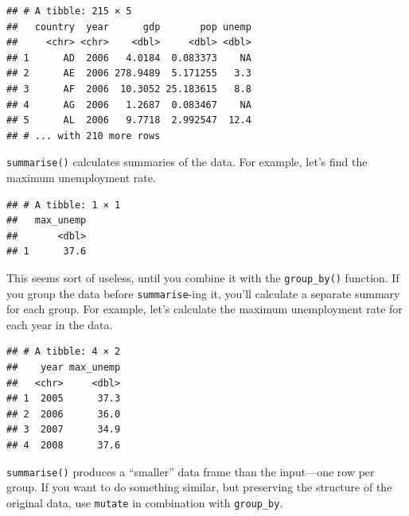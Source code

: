 \documentclass[12pt,oneside,openany]{book}
\newenvironment{Shaded}{\begin{snugshade}}{\end{snugshade}}
\newcommand{\KeywordTok}[1]{\textcolor[rgb]{0.13,0.29,0.53}{\textbf{#1}}}
\newcommand{\DataTypeTok}[1]{\textcolor[rgb]{0.13,0.29,0.53}{#1}}
\newcommand{\StringTok}[1]{\textcolor[rgb]{0.31,0.60,0.02}{#1}}
\newcommand{\OtherTok}[1]{\textcolor[rgb]{0.56,0.35,0.01}{#1}}
\newcommand{\OperatorTok}[1]{\textcolor[rgb]{0.81,0.36,0.00}{\textbf{#1}}}
\newcommand{\NormalTok}[1]{#1}
\begin{document}
\begin{verbatim}
## # A tibble: 215 × 5
##   country  year      gdp       pop unemp
##     <chr> <chr>    <dbl>     <dbl> <dbl>
## 1      AD  2006   4.0184  0.083373    NA
## 2      AE  2006 278.9489  5.171255   3.3
## 3      AF  2006  10.3052 25.183615   8.8
## 4      AG  2006   1.2687  0.083467    NA
## 5      AL  2006   9.7718  2.992547  12.4
## # ... with 210 more rows
\end{verbatim}

\texttt{summarise()} calculates summaries of the data. For example,
let's find the maximum unemployment rate.

\begin{Shaded}
\end{Shaded}

\begin{verbatim}
## # A tibble: 1 × 1
##   max_unemp
##       <dbl>
## 1      37.6
\end{verbatim}

This seems sort of useless, until you combine it with the
\texttt{group\_by()} function. If you group the data before
\texttt{summarise}-ing it, you'll calculate a separate summary for each
group. For example, let's calculate the maximum unemployment rate for
each year in the data.

\begin{Shaded}
\end{Shaded}

\begin{verbatim}
## # A tibble: 4 × 2
##    year max_unemp
##   <chr>     <dbl>
## 1  2005      37.3
## 2  2006      36.0
## 3  2007      34.9
## 4  2008      37.6
\end{verbatim}

\texttt{summarise()} produces a ``smaller'' data frame than the
input---one row per group. If you want to do something similar, but
preserving the structure of the original data, use \texttt{mutate} in
combination with \texttt{group\_by}.
\end{document}
